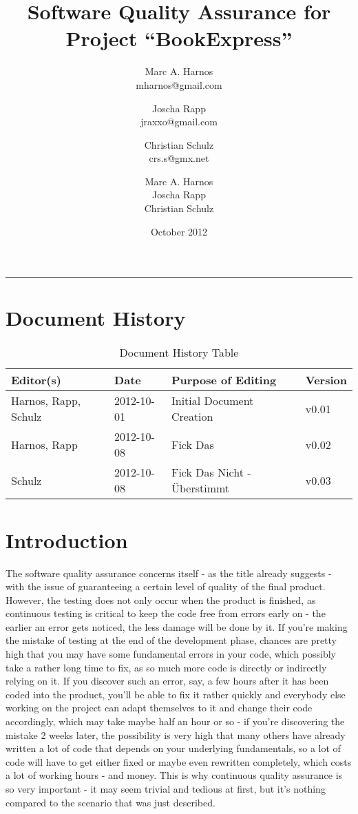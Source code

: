 \documentclass[11pt,a4paper,oneside,svgnames]{report}
\title{Software Quality Assurance for Project ``BookExpress''}
\author{Marc A. Harnos\\ {mharnos@gmail.com} \and Joscha Rapp\\ {jraxxo@gmail.com} \and Christian Schulz\\ {crs.s@gmx.net}}
\author{Marc A. Harnos\\ Joscha Rapp\\ Christian Schulz}
\date{October 2012}
\makeatletter
\renewcommand{\maketitle}{\begin{titlepage}%
    \let\footnotesize\small
    \let\footnoterule\relax
    \parindent \z@
    \reset@font
    \null\vfil
    \begin{flushleft}
      \huge \@title
    \end{flushleft}
    \par
    \hrule height 4pt
    \par
    \begin{flushright}
      \LARGE \@author \par
    \end{flushright}
    \vskip 60\p@
    \vfil\null
  \end{titlepage}%
  \setcounter{footnote}{0}%
}
\makeatother
\begin{document}
\maketitle
\tableofcontents

\chapter*{Document History}

\begin{table}[H]
\centering
\begin{tabular}{|l|l|l|l|}
\hline 
Editor(s) & Date & Purpose of Editing & Version \\ 
\hline 
Harnos, Rapp, Schulz & 2012-10-01 & Initial Document Creation & v0.01 \\ 
\hline
Harnos, Rapp & 2012-10-08 & Fick Das & v0.02 \\ 
\hline
Schulz & 2012-10-08 & Fick Das Nicht - Überstimmt & v0.03 \\ 
\hline
\end{tabular} 
\caption{Document History Table}
\label{tab:document-history}
\end{table}


\chapter{Introduction}
The software quality assurance concerns itself - as the title already suggests - with the issue of guaranteeing a certain level of quality of the final product. However, the testing does not only occur when the product is finished, as continuous testing is critical to keep the code free from errors early on - the earlier an error gets noticed, the less damage will be done by it. If you're making the mistake of testing at the end of the development phase, chances are pretty high that you may have some fundamental errors in your code, which possibly take a rather long time to fix, as so much more code is directly or indirectly relying on it. If you discover such an error, say, a few hours after it has been coded into the product, you'll be able to fix it rather quickly and everybody else working on the project can adapt themselves to it and change their code accordingly, which may take maybe half an hour or so - if you're discovering the mistake 2 weeks later, the possibility is very high that many others have already written a lot of code that depends on your underlying fundamentals, so a lot of code will have to get either fixed or maybe even rewritten completely, which costs a lot of working hours - and money. This is why continuous quality assurance is so very important - it may seem trivial and tedious at first, but it's nothing compared to the scenario that was just described.
\end{document}
